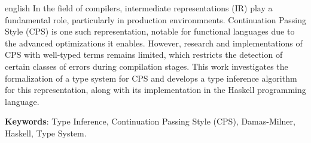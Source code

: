 
\begin{resumo}[Abstract]
  \begin{otherlanguage*}{english}
    In the field of compilers, intermediate representations (IR) play a fundamental role, particularly in production environmnents.
    Continuation Passing Style (CPS) is one such representation, notable for functional languages due to the advanced optimizations it enables.
    However, research and implementations of CPS with well-typed terms remains limited, which restricts the detection of certain classes of errors during compilation stages.
    This work investigates the formalization of a type system for CPS and develops a type inference algorithm for this representation, along with its implementation in the Haskell programming language.

    \textbf{Keywords}: Type Inference, Continuation Passing Style (CPS), Damas-Milner, Haskell, Type System.
  \end{otherlanguage*}
\end{resumo}

